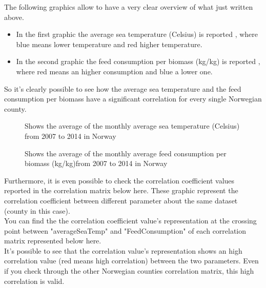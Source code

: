 \newpage

The following graphics allow to have a very clear overview of what just written above.\\
\vspace{-10mm}
\begin{itemize}
 \setlength{\itemsep}{-5pt}
 \item In the first graphic the average sea temperature (Celsius) is reported , where blue means lower temperature and red higher temperature.
 \item In the second graphic the feed consumption per biomass (kg/kg) is reported , where red means an higher consumption and blue a lower one.
\end{itemize}

So it's clearly possible to see how the average sea temperature and the feed consumption per biomass have a significant correlation for every single Norwegian county.

\begin{figure}[H]
    \caption{Shows the average of the monthly average sea temperature (Celsius) from 2007 to 2014 in Norway}
    \label{fig: Norway_averageSeaTemp}
\end{figure}

\begin{figure}[H]
    \caption{Shows the average of the monthly average feed consumption per biomass (kg/kg)from 2007 to 2014 in Norway}
    \label{fig: Norway_feed-biomass}
\end{figure}

\newpage

Furthermore, it is even possible to check the correlation coefficient values reported in the correlation matrix below here. These graphic represent the correlation coefficient between different parameter about the same dataset (county in this case).\\
You can find the the correlation coefficient value's representation at the crossing point between "averageSeaTemp" and "FeedConsumption" of each correlation matrix represented below here.\\
It's possible to see that the correlation value's representation shows an high correlation value (red means high correlation) between the two parameters. Even if you check through the other Norwegian counties correlation matrix, this high correlation is valid.\\


